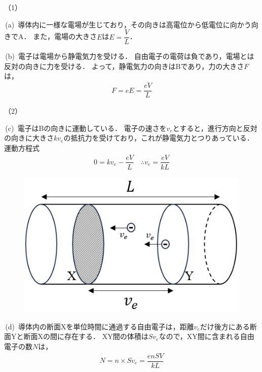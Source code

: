 \setcounter{eqNo}{0}
\setcounter{figure}{0}
\noindent （1）\par 
\noindent\,(a)\,
導体内に一様な電場が生じており，その向きは高電位から低電位に向かう向きでA．
また，電場の大きさ$E$は$E=\dfrac{V}{L}$．

\noindent\,(b)\,
電子は電場から静電気力を受ける．
自由電子の電荷は負であり，電場とは反対の向きに力を受ける．
よって，静電気力の向きはBであり，力の大きさ$F$は，
\begin{align*}
  F = eE = \dfrac{eV}{L}
\end{align*}

\noindent （2）\par 
\noindent\,(c)\,
電子はBの向きに運動している．
電子の速さを$v_e$とすると，進行方向と反対の向きに大きさ$kv_e$の抵抗力を受けており，これが静電気力とつりあっている．
運動方程式
\begin{align*}
  0 = kv_e-\dfrac{eV}{L} \quad \therefore v_e = \dfrac{eV}{kL}
\end{align*}

{
\begin{figure}
  \vspace{-\intextsep}
  \includegraphics[width=12zw]{../graphs/jumon_111_sol.png}
  \caption{}
\end{figure}
\noindent\,(d)\,
導体内の断面Xを単位時間に通過する自由電子は，距離$v_e$だけ後方にある断面Yと断面Xの間に存在する．
XY間の体積は$Sv_e$なので，XY間に含まれる自由電子の数$N$は，
\begin{align*}
  N = n\times Sv_e = \dfrac{enSV}{kL}
\end{align*}

\par}

